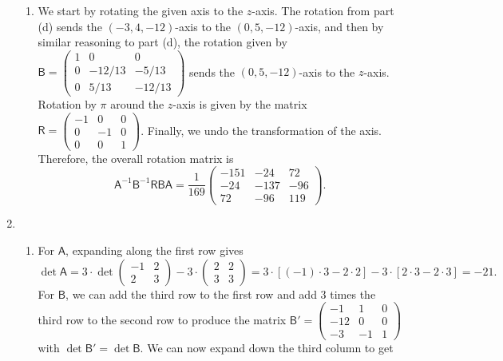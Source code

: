 \begin{enumerate}
\begin{enumerate}
\item We start by rotating the given axis to the $z$-axis. The rotation from part (d) sends the $(-3,4,-12)$-axis to the $(0,5,-12)$-axis, and then by similar reasoning to part (d), the rotation given by $\mathsf{B} = \begin{pmatrix} 1 & 0 & 0 \\ 0 & -12/13 & -5/13 \\ 0 & 5/13 & -12/13 \end{pmatrix}$ sends the $(0,5,-12)$-axis to the $z$-axis. Rotation by $\pi$ around the $z$-axis is given by the matrix $\mathsf{R} = \begin{pmatrix} -1 & 0 & 0 \\ 0 & -1 & 0 \\ 0 & 0 & 1 \end{pmatrix}$. Finally, we undo the transformation of the axis. Therefore, the overall rotation matrix is
\begin{equation*}
\mathsf{A}^{-1}\mathsf{B}^{-1}\mathsf{RBA} = \frac{1}{169}\begin{pmatrix} -151 & -24 & 72 \\ -24 & -137 & -96 \\ 72 & -96 & 119 \end{pmatrix}.
\end{equation*}
\end{enumerate}
\item \begin{enumerate}
\item For $\mathsf{A}$, expanding along the first row gives
\begin{equation*}
\det\mathsf{A} = 3\cdot\det\begin{pmatrix} -1 & 2 \\ 2 & 3 \end{pmatrix} - 3\cdot\begin{pmatrix} 2 & 2 \\ 3 & 3 \end{pmatrix} = 3\cdot [(-1)\cdot 3 - 2\cdot 2] - 3\cdot [2\cdot 3 - 2\cdot 3] = -21.
\end{equation*}
For $\mathsf{B}$, we can add the third row to the first row and add $3$ times the third row to the second row to produce the matrix $\mathsf{B}' = \begin{pmatrix} -1 & 1 & 0 \\ -12 & 0 & 0 \\ -3 & -1 & 1 \end{pmatrix}$ with $\det\mathsf{B}' = \det\mathsf{B}$. We can now expand down the third column to get

\end{enumerate}
\end{enumerate}
